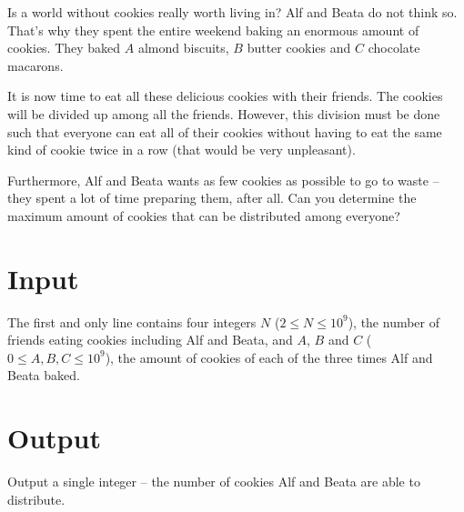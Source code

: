 Is a world without cookies really worth living in?
Alf and Beata do not think so.
That's why they spent the entire weekend baking an enormous amount of cookies.
They baked $A$ almond biscuits, $B$ butter cookies and $C$ chocolate macarons.

It is now time to eat all these delicious cookies with their friends.
The cookies will be divided up among all the friends.
However, this division must be done such that everyone can eat all of their cookies without having to eat the same kind of cookie twice in a row (that would be very unpleasant).

Furthermore, Alf and Beata wants as few cookies as possible to go to waste -- they spent a lot of time preparing them, after all.
Can you determine the maximum amount of cookies that can be distributed among everyone?

\section*{Input}
The first and only line contains four integers $N$ ($2 \le N \le 10^9$), the number of friends eating cookies including Alf and Beata, and $A$, $B$ and $C$ ($0 \le A, B, C \le 10^9$), the amount of cookies of each of the three times Alf and Beata baked.

\section*{Output}
Output a single integer -- the number of cookies Alf and Beata are able to distribute.
